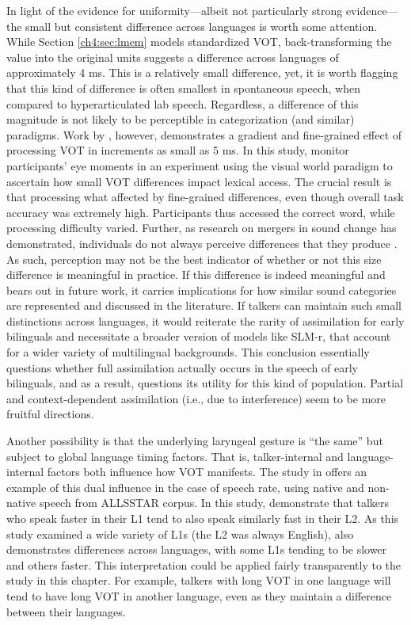 In light of the evidence for uniformity---albeit not particularly strong evidence---the small but consistent difference across languages is worth some attention. While Section \ref{ch4:sec:lmem} models standardized VOT, back-transforming the value into the original units suggests a difference across languages of approximately 4 ms. This is a relatively small difference, yet, it is worth flagging that this kind of difference is often smallest in spontaneous speech, when compared to hyperarticulated lab speech. Regardless, a difference of this magnitude is not likely to be perceptible in categorization (and similar) paradigms. Work by \citet{mcmurray_2002_gradient}, however, demonstrates a gradient and fine-grained effect of processing VOT in increments as small as 5 ms. In this study, \citeauthor{mcmurray_2002_gradient} monitor participants' eye moments in an experiment using the visual world paradigm to ascertain how small VOT differences impact lexical access. The crucial result is that processing what affected by fine-grained differences, even though overall task accuracy was extremely high. Participants thus accessed the correct word, while processing difficulty varied. Further, as research on mergers in sound change has demonstrated, individuals do not always perceive differences that they produce \citep{yu_2019_individual, cheng_UR_production}. As such, perception may not be the best indicator of whether or not this size difference is meaningful in practice. If this difference is indeed meaningful and bears out in future work, it carries implications for how similar sound categories are represented and discussed in the literature. If talkers can maintain such small distinctions across languages, it would reiterate the rarity of assimilation for early bilinguals and necessitate a broader version of models like SLM-r, that account for a wider variety of multilingual backgrounds. This conclusion essentially questions whether full assimilation actually occurs in the speech of early bilinguals, and as a result, questions its utility for this kind of population. Partial and context-dependent assimilation (i.e., due to interference) seem to be more fruitful directions.

Another possibility is that the underlying laryngeal gesture is ``the same'' but subject to global language timing factors. That is, talker-internal and language-internal factors both influence how VOT manifests. The study in \citet{bradlow_2017_rate} offers an example of this dual influence in the case of speech rate, using native and non-native speech from ALLSSTAR corpus. In this study, \citeauthor{bradlow_2017_rate} demonstrate that talkers who speak faster in their L1 tend to also speak similarly fast in their L2. As this study examined a wide variety of L1s (the L2 was always English), \citeauthor{bradlow_2017_rate} also demonstrates differences across languages, with some L1s tending to be slower and others faster. This interpretation could be applied fairly transparently to the study in this chapter. For example, talkers with long VOT in one language will tend to have long VOT in another language, even as they maintain a difference between their languages. 

